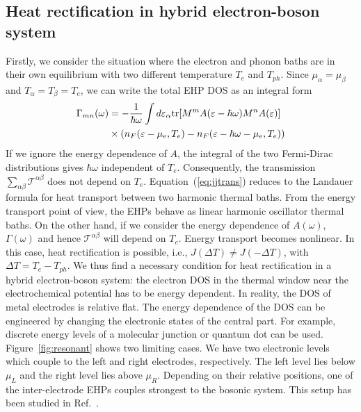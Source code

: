 \documentclass[aps
,floatfix,footinbib,
preprint
]{revtex4-1}
\begin{document}
\subsection{Heat rectification in hybrid electron-boson system}
Firstly, we consider the situation where the electron and phonon baths are in their own equilibrium with two different temperature $T_e$ and $T_{ph}$. Since $\mu_{\alpha}=\mu_{\beta}$ and $T_{\alpha}=T_\beta=T_e$, we can write the total EHP DOS as an integral form
\begin{align}
	\Gamma_{mn}(\omega)&=-\frac{1}{\hbar\omega}\int d\varepsilon_\alpha {\rm tr}[M^m A(\varepsilon-\hbar\omega)M^n A(\varepsilon)] \nonumber\\
	&\times (n_F(\varepsilon-\mu_e,T_e)-n_F(\varepsilon-\hbar\omega-\mu_e,T_e))
\end{align}
If we ignore the energy dependence of $A$, the integral of the two Fermi-Dirac distributions gives $\hbar\omega$ independent of $T_e$. Consequently,  the transmission $\sum_{\alpha\beta}\mathcal{T}^{\alpha\beta}$ does not depend on $T_e$. Equation~(\ref{eq:jjtrans}) reduces to the Landauer formula for heat transport between two harmonic thermal baths. From the energy transport point of view, the EHPs behave as linear harmonic oscillator thermal baths. On the other hand, if we consider the energy dependence of $A(\omega)$, $\Gamma(\omega)$ and hence $\mathcal{T}^{\alpha\beta}$ will depend on $T_e$. Energy transport becomes nonlinear. In this case, heat rectification is possible, i.e., $J(\Delta T)\neq J(-\Delta T)$, with $\Delta T=T_e-T_{ph}$. We thus find a necessary condition for heat rectification in a hybrid electron-boson system: the electron DOS in the thermal window near the electrochemical potential has to be energy dependent\cite{zhang2013thermal,ren2013heat}. In reality, the DOS of metal electrodes is relative flat. The energy dependence of the DOS can be engineered by changing the electronic states of the central part. For example, discrete energy levels of a molecular junction or quantum dot can be used. Figure~\ref{fig:resonant} shows two limiting cases. We have two electronic levels which couple to the left and right electrodes, respectively. The left level lies below $\mu_L$ and the right level lies above $\mu_R$. Depending on their relative positions, one of the inter-electrode EHPs couples strongest to the bosonic system. This setup has been studied in Ref.~.
\end{document}
